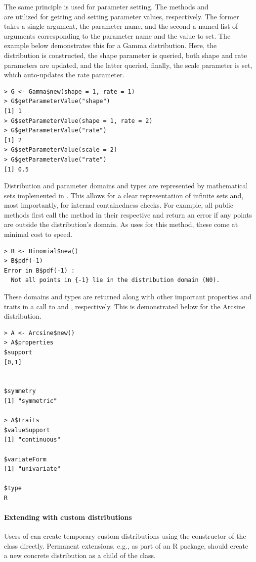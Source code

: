 The same principle is used for parameter setting. The methods  and \\  are utilized for getting and setting parameter values, respectively. The former takes a single argument, the parameter name, and the second a named list of arguments corresponding to the parameter name and the value to set. The example below demonstrates this for a Gamma distribution. Here, the distribution is constructed, the shape parameter is queried, both shape and rate parameters are updated, and the latter queried, finally, the scale parameter is set, which auto-updates the rate parameter.
\begin{verbatim}
> G <- Gamma$new(shape = 1, rate = 1)
> G$getParameterValue("shape")
[1] 1
> G$setParameterValue(shape = 1, rate = 2)
> G$getParameterValue("rate")
[1] 2
> G$setParameterValue(scale = 2)
> G$getParameterValue("rate")
[1] 0.5
\end{verbatim}

Distribution and parameter domains and types are represented by mathematical sets implemented in  \citep{pkgset6}. This allows for a clear representation of infinite sets and, most importantly, for internal containedness checks. For example, all public  methods first call the  method in their respective  and return an error if any points are outside the distribution's domain. As  uses  for this method, these come at minimal cost to speed.

\begin{verbatim}
> B <- Binomial$new()
> B$pdf(-1)
Error in B$pdf(-1) :
  Not all points in {-1} lie in the distribution domain (N0).
\end{verbatim}

These domains and types are returned along with other important properties and traits in a call to  and , respectively. This is demonstrated below for the Arcsine distribution.

\begin{verbatim}
> A <- Arcsine$new()
> A$properties
$support
[0,1]


$symmetry
[1] "symmetric"

> A$traits
$valueSupport
[1] "continuous"

$variateForm
[1] "univariate"

$type
R
\end{verbatim}


\paragraph{Extending  with custom distributions}
Users of  can create temporary custom distributions using the constructor of the  class directly. Permanent extensions, e.g., as part of an R package, should create a new concrete distribution as a child of the  class.


